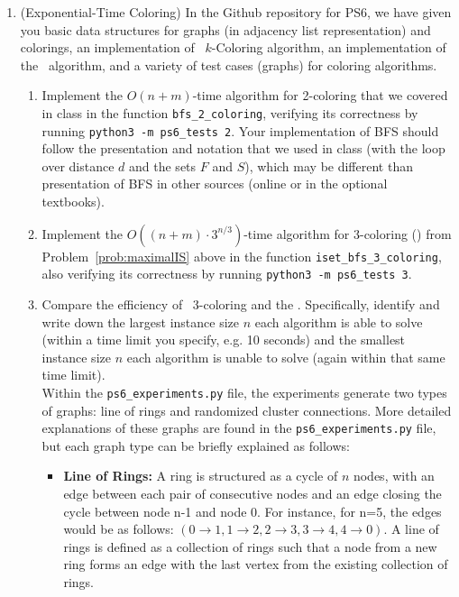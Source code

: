 \documentclass[11pt]{article}
\begin{document}
\begin{enumerate}
\begin{enumerate}
    \end{enumerate}
\item (Exponential-Time Coloring) 
  In the Github repository for PS6, we have given you basic data structures for graphs (in adjacency list representation) and colorings, an implementation of \ExhaustiveSearch\ $k$-Coloring algorithm, 
  an implementation of the \BronKerbosch\ algorithm, and 
    a variety of test cases (graphs) for coloring algorithms. 
    

  \begin{enumerate}
      \item Implement the $O(n+m)$-time algorithm for 2-coloring that we covered in class in the function \texttt{bfs\_2\_coloring}, verifying its correctness by running \texttt{python3 -m ps6\_tests 2}.
        Your implementation of BFS should follow the presentation and notation that we used in class (with the loop over distance $d$ and the sets $F$ and $S$), which may be different than presentation of BFS in other sources (online or in the optional textbooks). 
      
      \item Implement the $O((n+m)\cdot 3^{n/3})$-time algorithm for 3-coloring (\MaximalISColoring) from Problem~\ref{prob:maximalIS} above in the function \texttt{iset\_bfs\_3\_coloring}, also verifying its correctness by running \texttt{python3 -m ps6\_tests 3}. \label{part:TbT}
 
      
    
    
    \item 
    Compare the efficiency of \ExhaustiveSearch\ 3-coloring and the \MaximalISColoring. Specifically, identify and write down the largest instance size $n$ each algorithm is able to solve (within a time limit you specify, e.g. 10 seconds) and the smallest instance size $n$ each algorithm is unable to solve (again within that same time limit). \\

    Within the \texttt{ps6\_experiments.py} file, the experiments generate two types of graphs: line of rings and randomized cluster connections. More detailed explanations of these graphs are found in the  \texttt{ps6\_experiments.py} file, but each graph type can be briefly explained as follows: 
    \begin{itemize}
        \item \textbf{Line of Rings:} A ring is structured as a cycle of $n$ nodes, with an edge between each pair of consecutive nodes and an edge closing the cycle between node n-1 and node 0. For instance, for n=5, the edges would be as follows: $(0\to1, 1\to2, 2\to3, 3\to4, 4\to0)$. A line of rings is defined as a collection of rings such that a node from a new ring forms an edge with the last vertex from the existing collection of rings. 
        

\end{itemize}
\end{enumerate}
\end{enumerate}
\end{document}
